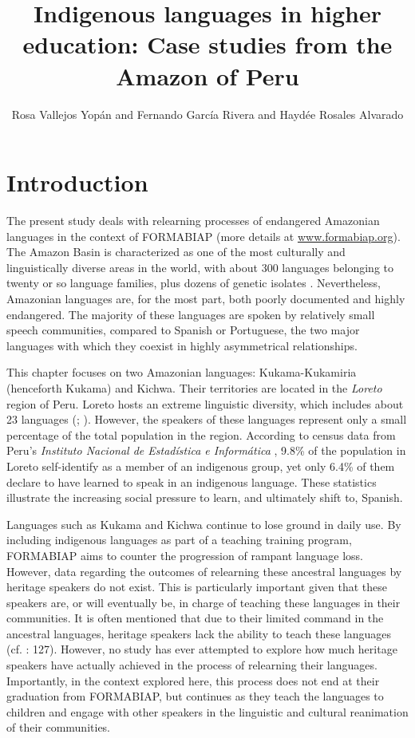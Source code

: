 \documentclass[output=paper]{langscibook}
\author{Rosa {Vallejos Yopán}\affiliation{University of New Mexico} and Fernando García Rivera\affiliation{FORMABIAP} and Haydée Rosales Alvarado\affiliation{FORMABIAP}}
\title{Indigenous languages in higher education: Case studies from the Amazon of Peru}
\begin{document}
\maketitle

\section{Introduction}\label{sec:7:1}
The present study deals with relearning processes of endangered Amazonian languages in the context of FORMABIAP (more details at \href{http://www.formabiap.org}{{www.formabiap.org}}). The Amazon Basin is characterized as one of the most culturally and linguistically diverse areas in the world, with about 300 languages belonging to twenty or so language families, plus dozens of genetic isolates \citep{Queixalós2009}. Nevertheless, Amazonian languages are, for the most part, both poorly documented and highly endangered. The majority of these languages are spoken by relatively small speech communities, compared to Spanish or Portuguese, the two major languages with which they coexist in highly asymmetrical relationships.

\begin{sloppypar}
This chapter focuses on two Amazonian languages: Kukama-Kukamiria (henceforth Kukama) and Kichwa. Their territories are located in the \textit{Loreto} region of Peru. Loreto hosts an extreme linguistic diversity, which includes about 23 languages (\citealt{SolísFonseca2009}; \citealt{Queixalós2009}). However, the speakers of these languages represent only a small percentage of the total population in the region. According to census data from Peru’s \textit{Instituto Nacional de Estadística e Informática} \citep{INEI2017}, 9.8\% of the population in Loreto self-identify as a member of an indigenous group, yet only 6.4\% of them declare to have learned to speak in an indigenous language. These statistics illustrate the increasing social pressure to learn, and ultimately shift to, Spanish.
\end{sloppypar}

\begin{sloppypar}
Languages such as Kukama and Kichwa continue to lose ground in daily use. By including indigenous languages as part of a teaching training program, FORMABIAP aims to counter the progression of rampant language loss. However, data regarding the outcomes of relearning these ancestral languages by heritage speakers do not exist. This is particularly important given that these speakers are, or will eventually be, in charge of teaching these languages in their communities. It is often mentioned that due to their limited command in the ancestral languages, heritage speakers lack the ability to teach these languages (cf. \citealt{LópezGarcía2016}: 127). However, no study has ever attempted to explore how much heritage speakers have actually achieved in the process of relearning their languages. Importantly, in the context explored here, this process does not end at their graduation from FORMABIAP, but continues as they teach the languages to children and engage with other speakers in the linguistic and cultural reanimation of their communities.
\end{sloppypar}
\end{document}
